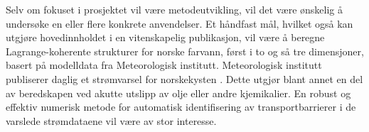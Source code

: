 Selv om fokuset i prosjektet vil være metodeutvikling, vil det være ønskelig å
undersøke en eller flere konkrete anvendelser. Et håndfast mål, hvilket også
kan utgjøre hovedinnholdet i en vitenskapelig
publikasjon, vil være å beregne Lagrange-koherente strukturer
for norske farvann, først i to og så tre dimensjoner, basert på modelldata fra
Meteorologisk institutt. Meteorologisk institutt publiserer daglig et
strømvarsel for norskekysten \parencite{albretsen2011norkyst}. Dette utgjør
blant annet en del av beredskapen ved akutte utslipp av olje eller andre
kjemikalier. En robust og effektiv numerisk metode for automatisk
identifisering av transportbarrierer i de varslede strømdataene vil være av stor
interesse.
